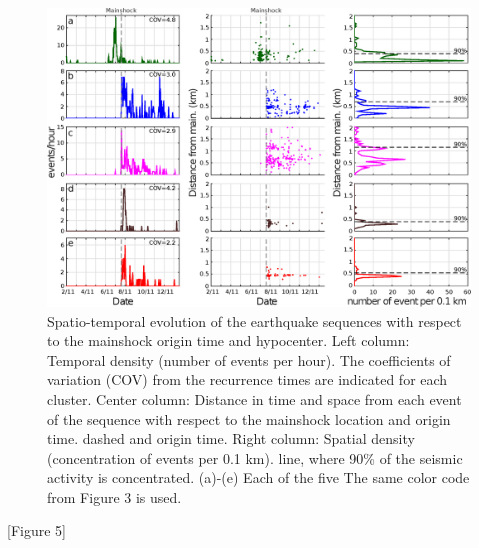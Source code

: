\documentclass[a4paper,12pt,twoside]{article}
\begin{document}
\begin{figure}
    \centering
     
     \includegraphics[width=1\linewidth]{densities_plot.eps}        
     \caption{Spatio-temporal evolution of the earthquake sequences with respect to the mainshock origin time and hypocenter. Left column: Temporal density (number of events per hour). The coefficients of variation (COV) from the recurrence times are indicated for each cluster. \protect{} Center column: Distance in time and space from each event of the sequence with respect to the mainshock location and origin time. \protect{} \protect{} dashed \protect{} \protect{} and \protect{} origin time. Right column: Spatial density (concentration of events per 0.1 km). \protect{} \protect{} line, where 90\% of the seismic activity is concentrated. (a)-(e) Each of the five \protect{} \protect{} The same color code from Figure 3 is used.}
\end{figure}     \label{fig:time_each_cluster}

\begin{center}
   [Figure 5]
\end{center}
\end{document}
